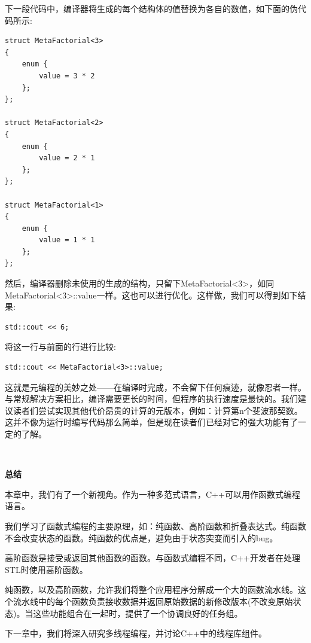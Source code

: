 下一段代码中，编译器将生成的每个结构体的值替换为各自的数值，如下面的伪代码所示: \par

\begin{lstlisting}[caption={}]
struct MetaFactorial<3>
{
	enum {
		value = 3 * 2
	};
};

struct MetaFactorial<2>
{
	enum {
		value = 2 * 1
	};
};

struct MetaFactorial<1>
{
	enum {
		value = 1 * 1
	};
};
\end{lstlisting}

然后，编译器删除未使用的生成的结构，只留下MetaFactorial<3>，如同MetaFactorial<3>::value一样。这也可以进行优化。这样做，我们可以得到如下结果: \par

\begin{lstlisting}[caption={}]
std::cout << 6;
\end{lstlisting}

将这一行与前面的行进行比较: \par

\begin{lstlisting}[caption={}]
std::cout << MetaFactorial<3>::value;
\end{lstlisting}

这就是元编程的美妙之处——在编译时完成，不会留下任何痕迹，就像忍者一样。与常规解决方案相比，编译需要更长的时间，但程序的执行速度是最快的。我们建议读者们尝试实现其他代价昂贵的计算的元版本，例如：计算第n个斐波那契数。这并不像为运行时编写代码那么简单，但是现在读者们已经对它的强大功能有了一定的了解。\par

\noindent\textbf{}\ \par
\textbf{总结} \ \par
本章中，我们有了一个新视角。作为一种多范式语言，C++可以用作函数式编程语言。 \par
我们学习了函数式编程的主要原理，如：纯函数、高阶函数和折叠表达式。纯函数不会改变状态的函数。纯函数的优点是，避免由于状态突变而引入的bug。 \par
高阶函数是接受或返回其他函数的函数。与函数式编程不同，C++开发者在处理STL时使用高阶函数。 \par
纯函数，以及高阶函数，允许我们将整个应用程序分解成一个大的函数流水线。这个流水线中的每个函数负责接收数据并返回原始数据的新修改版本(不改变原始状态)。当这些功能组合在一起时，提供了一个协调良好的任务组。 \par
下一章中，我们将深入研究多线程编程，并讨论C++中的线程库组件。 \par

